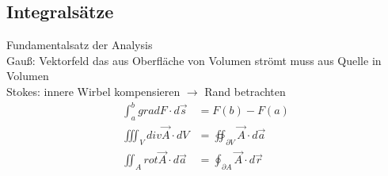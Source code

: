 
\subsection{Integralsätze}
Fundamentalsatz der Analysis\\
Gauß: Vektorfeld das aus Oberfläche von Volumen strömt muss aus Quelle in Volumen\\
Stokes: innere Wirbel kompensieren $\rightarrow$ Rand betrachten
\begin{align*}
    \int_{a}^b grad F \cdot d \vec{s}     & = F(b) - F(a)                                  \\
    \iiint_V div \vec{A} \cdot dV         & = \oiint_{ \partial V} \vec{A} \cdot d \vec{a} \\
    \iint_{A} rot \vec{A} \cdot d \vec{a} & = \oint_{ \partial A} \vec{A} \cdot d \vec{r}
\end{align*}



